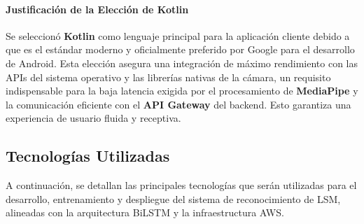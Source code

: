 \paragraph{Justificación de la Elección de Kotlin}
Se seleccionó \textbf{Kotlin} como lenguaje principal para la aplicación cliente debido a que es el estándar moderno y oficialmente preferido por Google para el desarrollo de Android. Esta elección asegura una integración de máximo rendimiento con las APIs del sistema operativo y las librerías nativas de la cámara, un requisito indispensable para la baja latencia exigida por el procesamiento de \textbf{MediaPipe} y la comunicación eficiente con el \textbf{API Gateway} del backend. Esto garantiza una experiencia de usuario fluida y receptiva.

\subsection{Tecnologías Utilizadas}

A continuación, se detallan las principales tecnologías que serán utilizadas para el desarrollo, entrenamiento y despliegue del sistema de reconocimiento de LSM, alineadas con la arquitectura BiLSTM y la infraestructura AWS.

